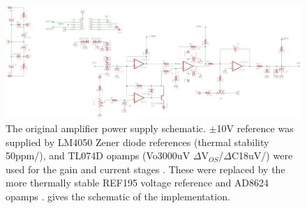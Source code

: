 \begin{figure}[ht]
 \centering
 \includegraphics[width=\textwidth]{./images/LNAPSU/LNF-PS2_schematic.png}
 \caption{The original amplifier power supply schematic. $\pm$10V reference was supplied by LM4050 Zener diode references (thermal stability 50ppm/\degc \cite{lm4050}), and TL074D opamps (Vo\approximately3000uV $\Delta$V$_{OS}$/$\Delta$C\approximately18uV/\degc \cite{tl074d}) were used for the gain and current stages . These were replaced by the more thermally stable REF195 voltage reference \cite{ref19x} and AD8624 opamps \cite{ad8624}.  gives the schematic of the implementation. }
 \label{fig:LNFPowerSupply}
\end{figure}



